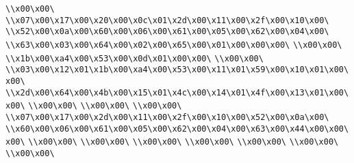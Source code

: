 \verb|\\x00\x00\|\newline
\verb|\\x07\x00\x17\x00\x20\x00\x0c\x01\x2d\x00\x11\x00\x2f\x00\x10\x00\|\newline
\verb|\\x52\x00\x0a\x00\x60\x00\x06\x00\x61\x00\x05\x00\x62\x00\x04\x00\|\newline
\verb|\\x63\x00\x03\x00\x64\x00\x02\x00\x65\x00\x01\x00\x00\x00\|\newline
\verb|\\x00\x00\|\newline
\verb|\\x1b\x00\xa4\x00\x53\x00\x0d\x01\x00\x00\|\newline
\verb|\\x00\x00\|\newline
\verb|\\x03\x00\x12\x01\x1b\x00\xa4\x00\x53\x00\x11\x01\x59\x00\x10\x01\x00\x00\|\newline
\verb|\\x2d\x00\x64\x00\x4b\x00\x15\x01\x4c\x00\x14\x01\x4f\x00\x13\x01\x00\x00\|\newline
\verb|\\x00\x00\|\newline
\verb|\\x00\x00\|\newline
\verb|\\x00\x00\|\newline
\verb|\\x07\x00\x17\x00\x2d\x00\x11\x00\x2f\x00\x10\x00\x52\x00\x0a\x00\|\newline
\verb|\\x60\x00\x06\x00\x61\x00\x05\x00\x62\x00\x04\x00\x63\x00\x44\x00\x00\x00\|\newline
\verb|\\x00\x00\|\newline
\verb|\\x00\x00\|\newline
\verb|\\x00\x00\|\newline
\verb|\\x00\x00\|\newline
\verb|\\x00\x00\|\newline
\verb|\\x00\x00\|\newline
\verb|\\x00\x00\|\newline
